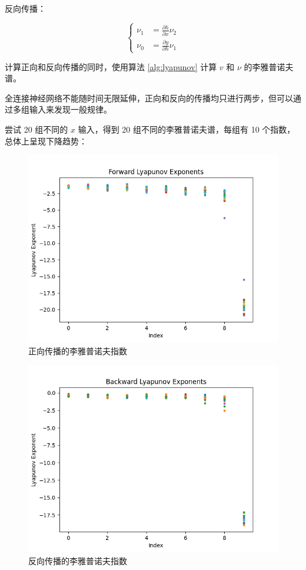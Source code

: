 反向传播：

\begin{equation}
  \left\{
    \begin{aligned}
      \nu_1 &= \frac{\partial h}{\partial x} \nu_2 \\
      \nu_0 &= \frac{\partial y}{\partial h} \nu_1
    \end{aligned}
  \right.
\end{equation}

计算正向和反向传播的同时，使用算法 \ref{alg:lyapunov} 计算 $v$ 和 $\nu$ 的李雅普诺夫谱。

全连接神经网络不能随时间无限延伸，正向和反向的传播均只进行两步，但可以通过多组输入来发现一般规律。

尝试 20 组不同的 $x$ 输入，得到 20 组不同的李雅普诺夫谱，每组有 10 个指数，总体上呈现下降趋势：

\begin{figure}[htbp]
  \centering
  \includegraphics[width=1\textwidth]{figures/forward_lyapunov.png}
  \caption{正向传播的李雅普诺夫指数}
  \label{fig:nn_lyapunov_exponents}
\end{figure}

\begin{figure}[htbp]
  \centering
  \includegraphics[width=1\textwidth]{figures/backward_lyapunov.png}
  \caption{反向传播的李雅普诺夫指数}
  \label{fig:nn_lyapunov_exponents}
\end{figure}

